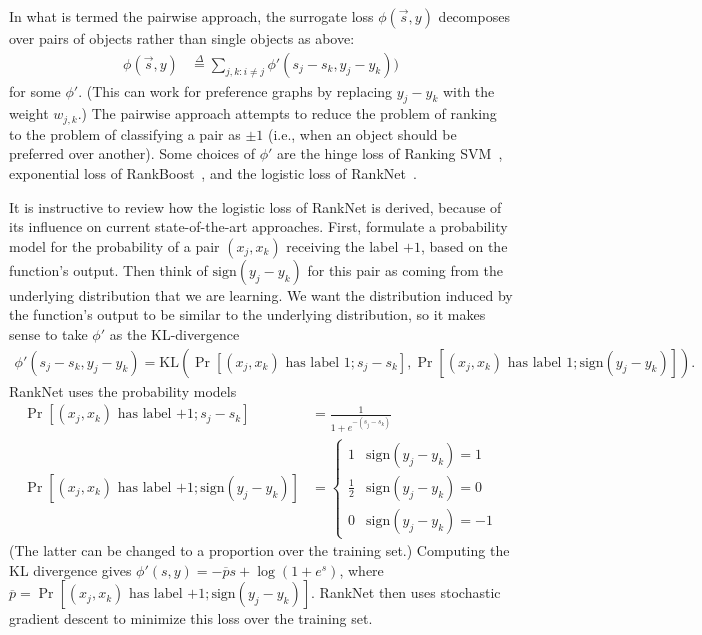 In what is termed the pairwise approach, the surrogate loss
$\phi(\vec{s}, y)$ decomposes over pairs of objects rather than single objects
as above:
\begin{align*}
  \phi(\vec{s}, y)
  &\stackrel{\Delta}{=}
  \sum_{j,k : i \neq j} \phi'(s_j - s_k, y_j - y_k))
\end{align*}
for some $\phi'$. (This can work for preference graphs by replacing $y_j - y_k$
with the weight $w_{j,k}$.)
The pairwise approach attempts to reduce the problem of
ranking to the problem of classifying a pair as $\pm 1$ (i.e.,
when an object should be preferred over another). Some choices of $\phi'$
are the hinge loss of Ranking SVM~\cite{Herbrich99rankingsvm},
exponential loss of RankBoost~\cite{Freund98rankboost},
and the logistic loss of RankNet~\cite{Burges05ranknet}.

It is instructive to review how the logistic loss of RankNet is derived, because
of its influence on current state-of-the-art approaches.
First, formulate a probability model for the probability
of a pair $(x_j, x_k)$ receiving the label $+1$, based on the function's
output. Then think of $\text{sign}(y_j - y_k)$
for this pair as coming from the underlying distribution that we are learning.
We want the distribution induced by the function's output to be similar to the
underlying distribution, so it makes sense to take $\phi'$ as the KL-divergence
\begin{align*}
  \phi'(s_j - s_k, y_j - y_k)
  = \text{KL}(\Pr[\text{$(x_j, x_k)$ has label $1$} ; s_j - s_k], \Pr[\text{$(x_j, x_k)$ has label $1$} ; \text{sign}(y_j - y_k)]).
\end{align*}
RankNet uses the probability models
\begin{align*}
  \Pr[\text{$(x_j, x_k)$ has label $+1$}; s_j - s_k] &= \frac{1}{1 + e^{-(s_j - s_k)}} \\
  \Pr[\text{$(x_j, x_k)$ has label $+1$} ; \text{sign}(y_j - y_k)] &=
  \begin{cases}
    1 & \text{sign}(y_j - y_k) = 1 \\
    \frac{1}{2} & \text{sign}(y_j - y_k) = 0 \\
    0 & \text{sign}(y_j - y_k) = -1
  \end{cases}
\end{align*}
(The latter can be changed to a proportion over the training set.)
Computing the KL divergence gives $\phi'(s, y) = -\overline{p} s + \log(1 + e^s)$,
where
$\overline{p} = \Pr[\text{$(x_j, x_k)$ has label $+1$} ; \text{sign}(y_j - y_k)]$.
RankNet then uses stochastic gradient descent to minimize this loss over the
training set.

